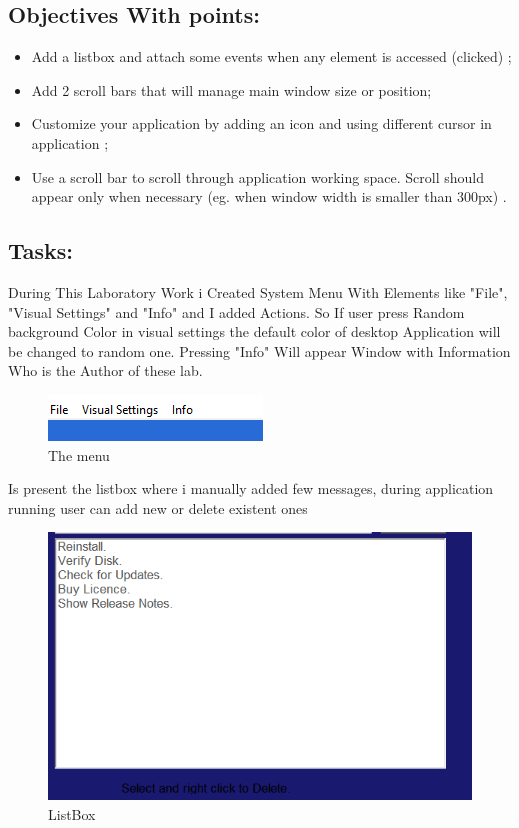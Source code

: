 \documentclass[12pt]{article}
\begin{document}
        \subsection*{Objectives With points:}
        \begin{itemize}
                \item Add a listbox and attach some events when any element is accessed (clicked) ;
                \item Add 2 scroll bars that will manage main window size or position;
                \item Customize your application by adding an icon and using different cursor in application ;
                \item Use a scroll bar to scroll through application working space. Scroll should appear only when necessary (eg. when window width is smaller than 300px) .
        \end{itemize}


        \subsection*{Tasks:}
        During This Laboratory Work i Created System Menu With Elements like "File", "Visual Settings" and "Info" and I added Actions. So If user press Random background Color in visual settings the default color of desktop Application will be changed to random one. Pressing "Info" Will appear Window with Information Who is the Author of these lab.
        \begin{figure}[H]
                \centering
                \includegraphics[width=.5\textwidth]{img1.png}
                \caption{The menu}
        \end{figure}
        \vspace{0.5 cm}

        Is present the listbox where i manually added few messages, during application running user can add new or delete existent ones
        \begin{figure}[H]
                \centering
                \includegraphics[width=.5\textwidth]{img3.png}
                \caption{ListBox}
        \end{figure}
        \vspace{0.5 cm}
         
\end{document}
